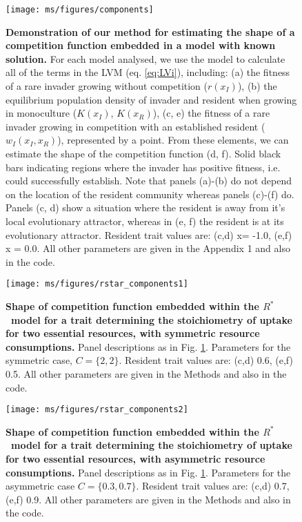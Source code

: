 \documentclass[a4paper,11pt]{article}
\newcommand{\Rstar}{\ensuremath{R^*}}
\begin{document}
\clearpage

\begin{figure}[ht]
 \centering
 \texttt{[image: ms/figures/components]}
 \caption{{\bf Demonstration of our method for estimating the shape of a competition function embedded in a model with known solution.} For each model analysed, we use the model to calculate all of the terms in the LVM (eq. \ref{eq:LVi}), including: (a) the fitness of a rare invader growing without competition ($r(x_I)$), (b) the equilibrium population density of invader and resident when growing in monoculture ($K(x_I)$, $K(x_R)$), (c, e) the fitness of a rare invader growing in competition with an established resident ($w_I(x_I, x_R)$), represented by a point. From these elements, we can estimate the shape of the competition function (d, f). Solid black bars indicating regions where the invader has positive fitness, i.e. could successfully establish. Note that panels (a)-(b) do not depend on the location of the resident community whereas panels (c)-(f) do. Panels (c, d) show a situation where the resident is away from it's local evolutionary attractor, whereas in (e, f) the resident is at its evolutionary attractor. Resident trait values are: (c,d) x= -1.0, (e,f) x = 0.0. All other parameters are given in the Appendix 1 and also in the code.}
\label{fig:components}
\end{figure}

\clearpage

\begin{figure}[ht]
  \centering
	\texttt{[image: ms/figures/rstar\_components1]}
  \caption{{\bf Shape of competition function embedded within the \Rstar\ model for a trait determining the stoichiometry of uptake for two essential resources, with symmetric resource consumptions.} Panel descriptions as in Fig. \ref{fig:components}. Parameters for the symmetric case, $C = \{2, 2\}$.   Resident trait values are: (c,d) 0.6, (e,f) 0.5. All other parameters are given in the Methods and also in the code.}
  \label{fig:Rstar}
\end{figure}

\clearpage

\begin{figure}[ht]
 \centering
 \texttt{[image: ms/figures/rstar\_components2]}
 \caption{{\bf Shape of competition function embedded within the \Rstar\ model for a trait determining the stoichiometry of uptake for two essential resources, with asymmetric resource consumptions.} Panel descriptions as in Fig. \ref{fig:components}. Parameters for the asymmetric case $C = \{0.3, 0.7\}$. Resident trait values are: (c,d) 0.7, (e,f) 0.9. All other parameters are given in the Methods and also in the code.} 
  \label{fig:rstar_components2}
\end{figure}
\end{document}
